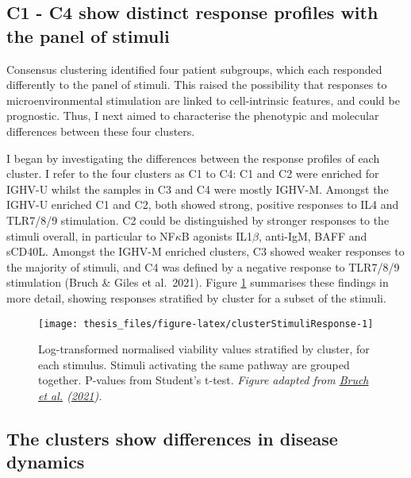 \documentclass[11pt, a4paper, twosided]{book}
\begin{document}
\hypertarget{c1---c4-show-distinct-response-profiles-with-the-panel-of-stimuli}{%
\subsection{C1 - C4 show distinct response profiles with the panel of stimuli}\label{c1---c4-show-distinct-response-profiles-with-the-panel-of-stimuli}}

Consensus clustering identified four patient subgroups, which each responded differently to the panel of stimuli. This raised the possibility that responses to microenvironmental stimulation are linked to cell-intrinsic features, and could be prognostic. Thus, I next aimed to characterise the phenotypic and molecular differences between these four clusters.

I began by investigating the differences between the response profiles of each cluster. I refer to the four clusters as C1 to C4: C1 and C2 were enriched for IGHV-U whilst the samples in C3 and C4 were mostly IGHV-M. Amongst the IGHV-U enriched C1 and C2, both showed strong, positive responses to IL4 and TLR7/8/9 stimulation. C2 could be distinguished by stronger responses to the stimuli overall, in particular to NF\(\kappa\)B agonists IL1\(\beta\), anti-IgM, BAFF and sCD40L. Amongst the IGHV-M enriched clusters, C3 showed weaker responses to the majority of stimuli, and C4 was defined by a negative response to TLR7/8/9 stimulation (Bruch \& Giles et al.~2021). Figure \ref{fig:clusterStimuliResponse} summarises these findings in more detail, showing responses stratified by cluster for a subset of the stimuli.


\begin{figure}

{\centering \texttt{[image: thesis\_files/figure-latex/clusterStimuliResponse-1]} 

}

\caption{Log-transformed normalised viability values stratified by cluster, for each stimulus. Stimuli activating the same pathway are grouped together. P-values from Student's t-test. \emph{Figure adapted from \protect\hyperlink{ref-Giles2021}{Bruch et al.} (\protect\hyperlink{ref-Giles2021}{2021}). }}\label{fig:clusterStimuliResponse}
\end{figure}
\hypertarget{cluster-survival}{%
\subsection{The clusters show differences in disease dynamics}\label{cluster-survival}}
\end{document}
